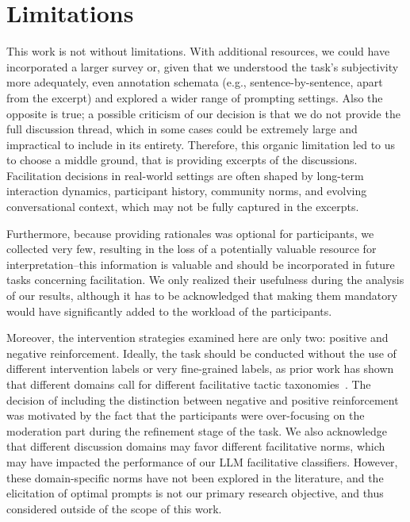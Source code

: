 \documentclass[11pt]{article}
\theoremstyle{definition}
\theoremstyle{plain}
\begin{document}
\section*{Limitations}
This work is not without limitations. With additional resources, we could have incorporated a larger survey or, given that we understood the task's subjectivity more adequately, even annotation schemata (e.g., sentence-by-sentence, apart from the excerpt) and explored a wider range of prompting settings. Also the opposite is true; a possible criticism of our decision is that we do not provide the full discussion thread, which in some cases could be extremely large and impractical to include in its entirety. Therefore, this organic limitation led to us to choose a middle ground, that is providing excerpts of the discussions. Facilitation decisions in real-world settings are often shaped by long-term interaction dynamics, participant history, community norms, and evolving conversational context, which may not be fully captured in the excerpts. 

Furthermore, because providing rationales was optional for participants, we collected very few, resulting in the loss of a potentially valuable resource for interpretation--this information is valuable and should be incorporated in future tasks concerning facilitation. We only realized their usefulness during the analysis of our results, although it has to be acknowledged that making them mandatory would have significantly added to the workload of the participants.

Moreover, the intervention strategies examined here are only two: positive and negative reinforcement. Ideally, the task should be conducted without the use of different intervention labels or very fine-grained labels, as prior work has shown that different domains call for different facilitative tactic taxonomies~\citep{ceri, chen-etal-2025-whow, schroeder-etal-2024-fora}. The decision of including the distinction between negative and positive reinforcement was motivated by the fact that the participants were over-focusing on the moderation part during the refinement stage of the task. We also acknowledge that different discussion domains may favor different facilitative norms, which may have impacted the performance of our LLM facilitative classifiers. However, these domain-specific norms have not been explored in the literature, and the elicitation of optimal prompts is not our primary research objective, and thus considered outside of the scope of this work.
\end{document}
